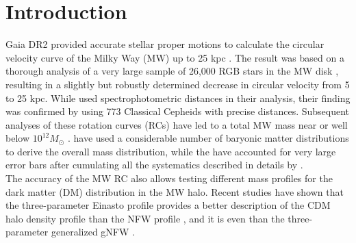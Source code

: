 \documentclass{aa}
\begin{document}


\maketitle



\section{Introduction}
Gaia DR2 provided accurate stellar proper motions to calculate the circular velocity curve of the Milky Way (MW) up to 25 kpc \citep{Eilers2019,Mroz2019}. The result was based on a thorough analysis of a very large sample of 26,000 RGB stars in the MW disk \citep{Eilers2019}, resulting in a slightly but robustly determined decrease in circular velocity from 5 to 25 kpc. While \citet[see also \citealt{Hogg2019}]{Eilers2019} used spectrophotometric distances in their analysis, their finding was confirmed by \cite{Mroz2019} using 773 Classical Cepheids with precise distances. Subsequent analyses of these rotation curves (RCs) have led to a total MW mass near or well below $10^{12} M_{\odot}$ \citep{Eilers2019,deSalas2019,Grand2019,Karukes2020}. \citet{Karukes2020} have used a considerable number of baryonic matter distributions to derive the overall mass distribution, while the \citet{deSalas2019} have accounted for very large error bars after cumulating all the systematics described in details by \citet{Eilers2019}.\\

The accuracy of the MW RC also allows testing different mass profiles for the dark matter (DM) distribution in the MW halo. Recent studies have shown that the three-parameter
Einasto profile \citep[see also \citealt{Retana-Montenegro2012}]{Einasto1965} provides a better description of the CDM halo density profile than the NFW profile \citep{Navarro2004,Navarro2010,Gao2008}, and it is even than the three-parameter generalized gNFW \citep{Klypin2016}. 



\end{document}

